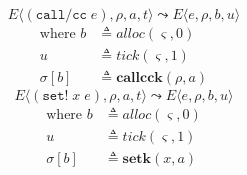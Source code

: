 \documentclass[12pt,draft]{article}
\newcommand{\callccsyn}[1]{(\texttt{call/cc}\;#1)}
\newcommand{\setsyn}[2]{(\texttt{set!}\;#1\;#2)}
\begin{document}
\begin{multicols*}{2}
\[
E\langle
\callccsyn{e} , \rho , a , t
\rangle
\leadsto
E\langle
e , \rho , b , u
\rangle
\]
\vspace{-11mm}
\begin{align*}
\text{where } b &\triangleq alloc(\varsigma, 0) \\
u &\triangleq tick(\varsigma, 1) \\
\sigma[b] &\triangleq \textbf{callcck}(\rho, a)
\end{align*}
\vspace{-5mm}
\[
E\langle
\setsyn{x}{e} , \rho , a , t
\rangle
\leadsto
E\langle
e , \rho , b , u
\rangle
\]
\vspace{-11mm}
\begin{align*}
\text{where } b &\triangleq alloc(\varsigma, 0) \\
u &\triangleq tick(\varsigma, 1) \\
\sigma[b] &\triangleq \textbf{setk}(x, a)
\end{align*}


\vfill\null
\columnbreak


\end{multicols*}
\end{document}
